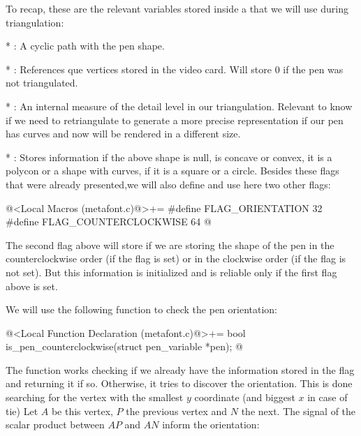 {{{{{To recap, these are the relevant variables stored inside
a  that we will use during
triangulation:

* : A cyclic path with the
  pen shape.

* : References que vertices stored in the
  video card. Will store 0 if the pen was not triangulated.

* : An internal measure of the
 detail level in our triangulation. Relevant to know if we need to
 retriangulate to generate a more precise representation if our pen has
 curves and now will be rendered in a different size.


* : Stores information if the above shape is
  null, is concave or convex, it is a polycon or a shape with curves,
  if it is a square or a circle. Besides these flags that were already
  presented,we will also define and use here two other flags:

\iniciocodigo
@<Local Macros (metafont.c)@>+=
#define FLAG_ORIENTATION      32
#define FLAG_COUNTERCLOCKWISE 64
@
\fimcodigo

The second flag above will store if we are storing the shape of the
pen in the counterclockwise order (if the flag is set) or in the
clockwise order (if the flag is not set). But this information is
initialized and is reliable only if the first flag above is set.

We will use the following function to check the pen orientation:

\iniciocodigo
@<Local Function Declaration (metafont.c)@>+=
bool is_pen_counterclockwise(struct pen_variable *pen);
@
\fimcodigo

The function works checking if we already have the information stored
in the flag and returning it if so. Otherwise, it tries to discover
the orientation. This is done searching for the vertex with the
smallest $y$ coordinate (and biggest $x$ in case of tie) Let $A$ be
this vertex, $P$ the previous vertex and $N$ the next. The signal of
the scalar product between $AP$ and $AN$ inform the orientation:

}}}}}
